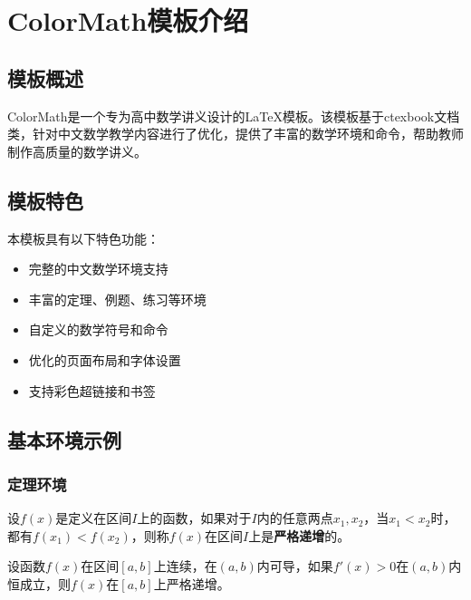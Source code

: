 \documentclass{ColorMath}
\begin{document}
\maketitle
\tableofcontents

\chapter{ColorMath模板介绍}

\section{模板概述}

ColorMath是一个专为高中数学讲义设计的\LaTeX{}模板。该模板基于ctexbook文档类，针对中文数学教学内容进行了优化，提供了丰富的数学环境和命令，帮助教师制作高质量的数学讲义。

\section{模板特色}

本模板具有以下特色功能：

\begin{itemize}
    \item 完整的中文数学环境支持
    \item 丰富的定理、例题、练习等环境
    \item 自定义的数学符号和命令
    \item 优化的页面布局和字体设置
    \item 支持彩色超链接和书签
\end{itemize}

\section{基本环境示例}

\subsection{定理环境}

\begin{definition}
    设$f(x)$是定义在区间$I$上的函数，如果对于$I$内的任意两点$x_1, x_2$，当$x_1 < x_2$时，都有$f(x_1) < f(x_2)$，则称$f(x)$在区间$I$上是\textbf{严格递增}的。
\end{definition}

\begin{theorem}
    设函数$f(x)$在区间$[a,b]$上连续，在$(a,b)$内可导，如果$f'(x) > 0$在$(a,b)$内恒成立，则$f(x)$在$[a,b]$上严格递增。
\end{theorem}
\end{document}
